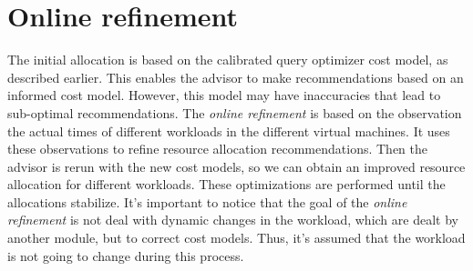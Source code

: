 \section{Online refinement}

The initial allocation is based on the calibrated query optimizer cost model, as described earlier. This enables the advisor to make recommendations based on an informed cost model. However, this model may have inaccuracies that lead to sub-optimal recommendations. The  \textit{online refinement} is based on the observation the actual times of different workloads in the different virtual machines. It uses these observations to refine resource allocation recommendations. Then the advisor is rerun with the new cost models, so  we can obtain an improved resource allocation for different workloads. These optimizations are performed until the allocations stabilize. It's important to notice that the goal of the \textit{online refinement} is not deal with dynamic changes in the workload, which are dealt by another module, but to correct cost models. Thus, it's assumed that the workload is not going to change during this process. 


